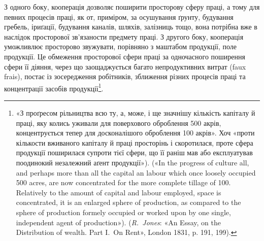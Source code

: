 З одного боку, кооперація дозволяє поширити просторову
сферу праці, а тому для певних процесів праці, як от, приміром,
за осушування ґрунту, будування гребель, іриґації, будування
каналів, шляхів, залізниць тощо, вона потрібна вже в наслідок
просторової зв’язаности предмету праці. З другого боку, кооперація
уможливлює просторово звужувати, порівняно з маштабом
продукції, поле продукції. Це обмеження просторової сфери праці
за одночасного поширення сфери її діяння, через що заощаджується
багато непродуктивних витрат (faux frais), постає із зосередження
робітників, зближення різних процесів праці та концентрації
засобів продукції\footnote{
«З проґресом рільництва всю ту, а, може, і ще значнішу кількість
капіталу й праці, яку колись уживали для поверхового оброблення 500 акрів,
концентрується тепер для досконалішого оброблення 100 акрів».
Хоч «проти кількости вживаного капіталу й праці просторінь і скоротилася,
проте сфера продукції поширилася супроти тієї сфери, що її
раніш мав або експлуатував поодинокий незалежний аґент продукції»).
(«In the progress of culture all, and perhaps more than all the capital an
labour which once loosely occupied 500 acres, are now concentrated for the
more complete tillage of 100. Relatively to the amount of capital and labour
employed, space is concentrated, it is an enlarged sphere of production,
as compared to the sphere of production formely occupied or worked upon
by one single, independent agent of production»). (\emph{R.~Jones}: «An Essay,
on the Distribution of wealth. Part I.~On Rent», London 1831, p. 191,
199).
}.

